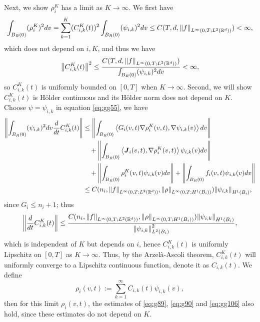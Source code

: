 \documentclass[a4paper, 11pt]{article}
\newcommand{\inner}[2]{\left< #1 , #2 \right>}
\theoremstyle{plain}
\theoremstyle{remark}
\theoremstyle{definition}
\newcommand{\intr}{\int_{B_R(0)}}
\newcommand{\J}{\boldsymbol{J}}
\begin{document}
		
	Next, we show $\rho_i^K$ has a limit as $K\to\infty$.	We first have
		\begin{equation}
			\intr (\rho^K_i)^2dv=\sum_{k=1}^{K}(C_{i,k}^K(t))^2\intr(\psi_{i,k})^2dv\leq C(T,d,\norm{f}_{L^{\infty}(0,T;L^2(\mathbb{R}^d))})<\infty,
		\end{equation}
		which does not depend on $i,K$, and thus we have
		\begin{equation}
			\norm{C_{i,k}^K(t)}^2\leq\frac{C(T,d,\norm{f}_{L^{\infty}(0,T;L^2(\mathbb{R}^d))})}{\intr(\psi_{i,k})^2dv}<\infty,
		\end{equation}
		so $C_{i,k}^K(t)$ is uniformly bounded on $[0,T]$ when $K\to\infty$. Second, we will show $C_{i,k}^K(t)$ is H\"older continuous and its H\"older norm does not depend on $K$. 
Choose $\psi=\psi_{i,k}$ in equation \eqref{eq:gg55}, we have
		\begin{equation}
			\begin{aligned}
				\norm{\intr (\psi_{i,k})^2dv\frac{d}{dt}C^K_{i,k}(t)}&\leq \norm{\intr \inner{G_i(v,t)\nabla\rho^K_i(v,t)}{\nabla\psi_{i,k}(v)}dv}\\
				&\quad+\norm{\intr \inner{\J_i(v,t)}{\nabla\rho^K_i(v,t)}\psi_{i,k}(v)dv}\\
				&\quad +\norm{\intr \rho^K_i(v,t)\psi_{i,k}(v)dv}+\norm{\intr f_i(v,t)\psi_{i,k}(v)dv}\\
				&\leq C(n_i,\norm{f}_{L^{\infty}(0,T;L^2(\mathbb{R}^d))},\norm{\rho}_{L^{\infty}(0,T;H^1(B_i))})\norm{\psi_{i,k}}_{H^1(B_i)},
			\end{aligned}
		\end{equation}
		since $G_i\leq n_i+1$; thus
		\begin{equation}
			\norm{\frac{d}{dt}C^K_{i,k}(t)}\leq \frac{C(n_i,\norm{f}_{L^{\infty}(0,T;L^2(\mathbb{R}^d))},\norm{\rho}_{L^{\infty}(0,T;H^1(B_i))})\norm{\psi_{i,k}}_{H^1(B_i)}}{\norm{\psi_{i,k}}^2_{L^2(B_i)}},
		\end{equation}
		which is independent of $K$ but depends on $i$, hence $C^K_{i,k}(t)$ is uniformly Lipschitz on $[0,T]$ as $K\to\infty$. Thus, by the Arzel\`a-Ascoli theorem, $C^K_{i,k}(t)$ will uniformly converge to a Lipschitz continuous function, denote it as $C_{i,k}(t)$. We define
		\begin{equation}
			\rho_i(v,t):=\sum_{k=1}^\infty C_{i,k}(t)\psi_{i,k}(v),
		\end{equation}
		then for this limit $\rho_i(v,t)$, the estimates of \eqref{eq:g89}, \eqref{eq:g90} and \eqref{eq:gg106} also hold, since these estimates do not depend on $K$. 
        
\end{document}
